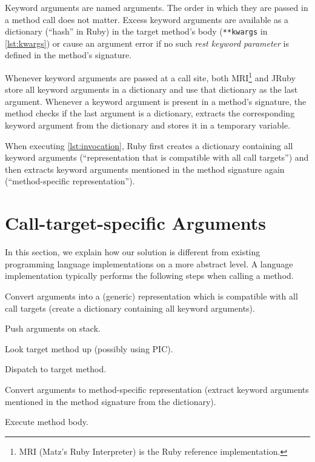 \documentclass{sigplanconf} %
\begin{document}
Keyword arguments are named arguments. The order in which they are passed in a method call does not matter. Excess keyword arguments are available as a dictionary (``hash'' in Ruby) in the target method's body (\lstinline{**kwargs} in \autoref{lst:kwargs}) or cause an argument error if no such \emph{rest keyword parameter} is defined in the method's signature.

Whenever keyword arguments are passed at a call site, both MRI\footnote{MRI (Matz's Ruby Interpreter) is the Ruby reference implementation.} and JRuby store all keyword arguments in a dictionary and use that dictionary as the last argument. Whenever a keyword argument is present in a method's signature, the method checks if the last argument is a dictionary, extracts the corresponding keyword argument from the dictionary and stores it in a temporary variable.

When executing \autoref{lst:invocation}, Ruby first creates a dictionary containing all keyword arguments (``representation that is compatible with all call targets'') and then extracts keyword arguments mentioned in the method signature again (``method-specific representation'').


\section{Call-target-specific Arguments}
In this section, we explain how our solution is different from existing programming language implementations on a more abstract level. A language implementation typically performs the following steps when calling a method.

\begin{Compactenum}
       \item Convert arguments into a (generic) representation which is compatible with all call targets (\eg create a dictionary containing all keyword arguments).
       \item Push arguments on stack.
       \item Look target method up (possibly using PIC).
       \item Dispatch to target method.
       \item Convert arguments to method-specific representation (\eg extract keyword arguments mentioned in the method signature from the dictionary).
       \item Execute method body.
\end{Compactenum}
\end{document}

